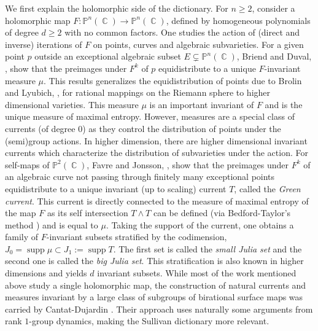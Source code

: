 \documentclass[12pt]{amsbook}%
\theoremstyle{definition}
\theoremstyle{remark}
\numberwithin{section}{chapter}
\numberwithin{subsection}{section}
\numberwithin{figure}{chapter}
\DeclareMathOperator{\C}{\mathbb{C}}
\DeclareMathOperator{\supp}{supp}
\def\bP{{\mathbb{P}}}
\begin{document}
We first explain the holomorphic side of the dictionary. For $n\geqslant 2$, consider a holomorphic map $F \colon \bP^n(\C) \to \bP^n(\C)$,  defined by homogeneous polynomials of degree $d \geqslant 2$ with no common factors. One studies the action of (direct and inverse) iterations of $F$ on points, curves and algebraic subvarieties. 
For a given point $p$ outside an exceptional algebraic subset $E \subsetneq \bP^n(\C)$, Briend and Duval, \cite{briend_duval}, show that the preimages under $F^k$ of $p$ equidistribute to a unique $F$-invariant measure  $\mu$. This results  generalizes the equidistribution of points due to Brolin and Lyubich, \cite{brolin,lyubich_equidistribution}, for rational mappings on the Riemann sphere to higher dimensional varieties.
This  measure $\mu$ is an important invariant of $F$ and is the unique measure of maximal entropy. However,  measures are a special class of currents (of degree $0$) as they control the distribution of points under the (semi)group actions. In higher dimension, there are higher dimensional invariant currents which characterize the distribution of subvarieties under the action. 
  For self-maps of $\bP^2(\C)$, Favre and Jonsson, \cite{favre_jonsson_brolin}, show that the preimages under $F^k$ of an algebraic curve not passing through finitely many exceptional points equidistribute to a unique invariant (up to scaling) current $T$, called the {\em Green current}. 
  This current is directly connected to the measure of maximal entropy of the map $F$ as its self intersection $T\wedge T$ can be defined (via Bedford-Taylor's method \cite{bedford_taylor}) and is equal to $\mu$. Taking the support of the current, one obtains a family of $F$-invariant subsets stratified by the codimension, $J_0= \supp \mu \subset J_1 := \supp T$.
   The first set is called the {\em small Julia set} and  the second one is called the {\em big Julia set}.  This stratification is also known in higher dimensions and yields $d$ invariant subsets.  
While most of the work mentioned above study  a single holomorphic map,  the construction of natural currents and measures invariant by a large class of  subgroups of birational surface maps was carried by  Cantat-Dujardin \cite{cantat_dujardin}. Their approach uses naturally some arguments  from rank $1$-group dynamics, making the Sullivan dictionary more relevant. 
\end{document}
